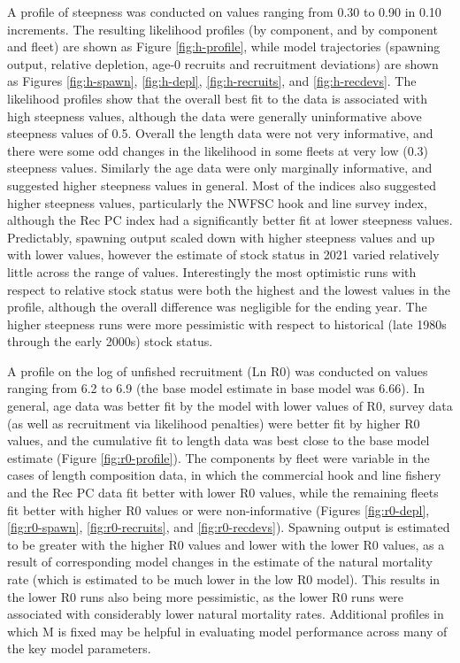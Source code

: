 \documentclass[11pt,
  english,
]{article}
\begin{document}
A profile of steepness was conducted on values ranging from 0.30 to 0.90 in 0.10 increments. The resulting likelihood profiles (by component, and by component and fleet) are shown as Figure \ref{fig:h-profile}, while model trajectories (spawning output, relative depletion, age-0 recruits and recruitment deviations) are shown as Figures \ref{fig:h-spawn}, \ref{fig:h-depl}, \ref{fig:h-recruits}, and \ref{fig:h-recdevs}. The likelihood profiles show that the overall best fit to the data is associated with high steepness values, although the data were generally uninformative above steepness values of 0.5. Overall the length data were not very informative, and there were some odd changes in the likelihood in some fleets at very low (0.3) steepness values. Similarly the age data were only marginally informative, and suggested higher steepness values in general. Most of the indices also suggested higher steepness values, particularly the NWFSC hook and line survey index, although the Rec PC index had a significantly better fit at lower steepness values. Predictably, spawning output scaled down with higher steepness values and up with lower values, however the estimate of stock status in 2021 varied relatively little across the range of values. Interestingly the most optimistic runs with respect to relative stock status were both the highest and the lowest values in the profile, although the overall difference was negligible for the ending year. The higher steepness runs were more pessimistic with respect to historical (late 1980s through the early 2000s) stock status.

A profile on the log of unfished recruitment (Ln R0) was conducted on values ranging from 6.2 to 6.9 (the base model estimate in base model was 6.66). In general, age data was better fit by the model with lower values of R0, survey data (as well as recruitment via likelihood penalties) were better fit by higher R0 values, and the cumulative fit to length data was best close to the base model estimate (Figure \ref{fig:r0-profile}). The components by fleet were variable in the cases of length composition data, in which the commercial hook and line fishery and the Rec PC data fit better with lower R0 values, while the remaining fleets fit better with higher R0 values or were non-informative (Figures \ref{fig:r0-depl}, \ref{fig:r0-spawn}, \ref{fig:r0-recruits}, and \ref{fig:r0-recdevs}). Spawning output is estimated to be greater with the higher R0 values and lower with the lower R0 values, as a result of corresponding model changes in the estimate of the natural mortality rate (which is estimated to be much lower in the low R0 model). This results in the lower R0 runs also being more pessimistic, as the lower R0 runs were associated with considerably lower natural mortality rates. Additional profiles in which M is fixed may be helpful in evaluating model performance across many of the key model parameters.
\end{document}
